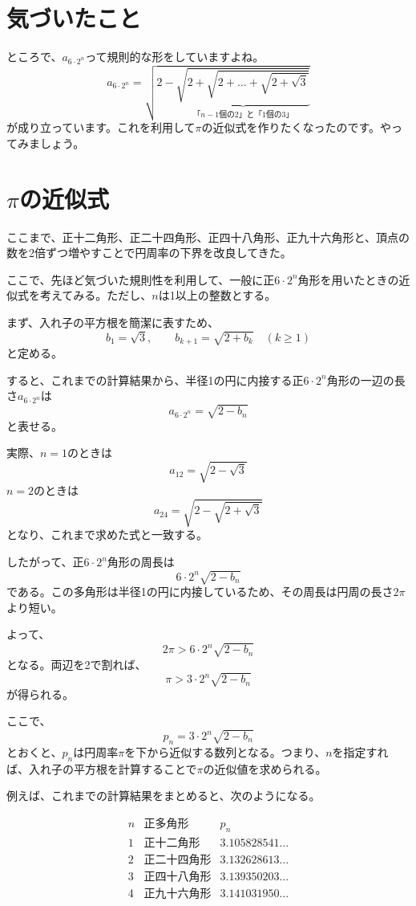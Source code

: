 \documentclass[dvipdfmx]{jlreq}
\begin{document}
\section{気づいたこと}
ところで、$a_{6\cdot2^n}$って規則的な形をしていますよね。
\[
a_{6\cdot2^n}=\sqrt{2-\underbrace{\sqrt{2+\sqrt{2+\dots+\sqrt{2+\sqrt{3}}}}}_{\text{「}n-1\text{個の2」と「1個の3」}}}
\]
が成り立っています。これを利用して$\pi$の近似式を作りたくなったのです。やってみましょう。
\section{$\pi$の近似式}

ここまで、正十二角形、正二十四角形、正四十八角形、正九十六角形と、頂点の数を2倍ずつ増やすことで円周率の下界を改良してきた。

ここで、先ほど気づいた規則性を利用して、一般に正$6\cdot 2^n$角形を用いたときの近似式を考えてみる。ただし、$n$は1以上の整数とする。

まず、入れ子の平方根を簡潔に表すため、
\[
b_1=\sqrt{3},\qquad
b_{k+1}=\sqrt{2+b_k}\quad(k\geq 1)
\]
と定める。

すると、これまでの計算結果から、半径1の円に内接する正$6\cdot 2^n$角形の一辺の長さ$a_{6\cdot 2^n}$は
\[
a_{6\cdot 2^n}=\sqrt{2-b_n}
\]
と表せる。

実際、$n=1$のときは
\[
a_{12}=\sqrt{2-\sqrt{3}}
\]
$n=2$のときは
\[
a_{24}=\sqrt{2-\sqrt{2+\sqrt{3}}}
\]
となり、これまで求めた式と一致する。

したがって、正$6\cdot 2^n$角形の周長は
\[
6\cdot 2^n\sqrt{2-b_n}
\]
である。この多角形は半径1の円に内接しているため、その周長は円周の長さ$2\pi$より短い。

よって、
\[
2\pi>6\cdot 2^n\sqrt{2-b_n}
\]
となる。両辺を2で割れば、
\[
\boxed{\pi>3\cdot 2^n\sqrt{2-b_n}}
\]
が得られる。

ここで、
\[
p_n=3\cdot 2^n\sqrt{2-b_n}
\]
とおくと、$p_n$は円周率$\pi$を下から近似する数列となる。つまり、$n$を指定すれば、入れ子の平方根を計算することで$\pi$の近似値を求められる。

例えば、これまでの計算結果をまとめると、次のようになる。

\[
\begin{array}{c|c|c}
n & \text{正多角形} & p_n\\ \hline
1 & \text{正十二角形} & 3.105828541\ldots\\
2 & \text{正二十四角形} & 3.132628613\ldots\\
3 & \text{正四十八角形} & 3.139350203\ldots\\
4 & \text{正九十六角形} & 3.141031950\ldots
\end{array}
\]
\end{document}
